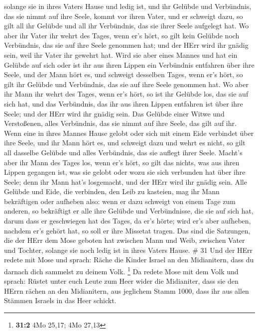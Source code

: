 solange sie in ihres Vaters Hause und ledig ist,  und ihr
Gelübde und Verbündnis, das sie nimmt auf ihre Seele, kommt vor ihren
Vater, und er schweigt dazu, so gilt all ihr Gelübde und all ihr
Verbündnis, das sie ihrer Seele aufgelegt hat.  Wo aber ihr
Vater ihr wehrt des Tages, wenn er's hört, so gilt kein Gelübde noch
Verbündnis, das sie auf ihre Seele genommen hat; und der HErr wird ihr
gnädig sein, weil ihr Vater ihr gewehrt hat.  Wird sie aber
eines Mannes und hat ein Gelübde auf sich oder ist ihr aus ihren Lippen
ein Verbündnis entfahren über ihre Seele,  und der Mann hört
es, und schweigt desselben Tages, wenn er's hört, so gilt ihr Gelübde
und Verbündnis, das sie auf ihre Seele genommen hat.  Wo
aber ihr Mann ihr wehrt des Tages, wenn er's hört, so ist ihr Gelübde
los, das sie auf sich hat, und das Verbündnis, das ihr aus ihren Lippen
entfahren ist über ihre Seele; und der HErr wird ihr gnädig sein.
 Das Gelübde einer Witwe und Verstoßenen, alles Verbündnis,
das sie nimmt auf ihre Seele, das gilt auf ihr.  Wenn eine
in ihres Mannes Hause gelobt oder sich mit einem Eide verbindet über
ihre Seele,  und ihr Mann hört es, und schweigt dazu und
wehrt es nicht, so gilt all dasselbe Gelübde und alles Verbündnis, das
sie auflegt ihrer Seele.  Macht's aber ihr Mann des Tages
los, wenn er's hört, so gilt das nichts, was aus ihren Lippen gegangen
ist, was sie gelobt oder wozu sie sich verbunden hat über ihre Seele;
denn ihr Mann hat's losgemacht, und der HErr wird ihr gnädig sein.
 Alle Gelübde und Eide, die verbinden, den Leib zu
kasteien, mag ihr Mann bekräftigen oder aufheben also: 
wenn er dazu schweigt von einem Tage zum anderen, so bekräftigt er alle
ihre Gelübde und Verbündnisse, die sie auf sich hat, darum dass er
geschwiegen hat des Tages, da er's hörte;  wird er's aber
aufheben, nachdem er's gehört hat, so soll er ihre Missetat tragen.
 Das sind die Satzungen, die der HErr dem Mose geboten hat
zwischen Mann und Weib, zwischen Vater und Tochter, solange sie noch
ledig ist in ihres Vaters Hause. \# 31  Und der HErr redete
mit Mose und sprach:  Räche die Kinder Israel an den
Midianitern, dass du darnach dich sammelst zu deinem Volk. \footnote{\textbf{31:2}
  4Mo 25,17; 4Mo 27,13}  Da redete Mose mit dem Volk und
sprach: Rüstet unter euch Leute zum Heer wider die Midianiter, dass sie
den HErrn rächen an den Midianitern,  aus jeglichem Stamm
1000, dass ihr aus allen Stämmen Israels in das Heer schickt.
